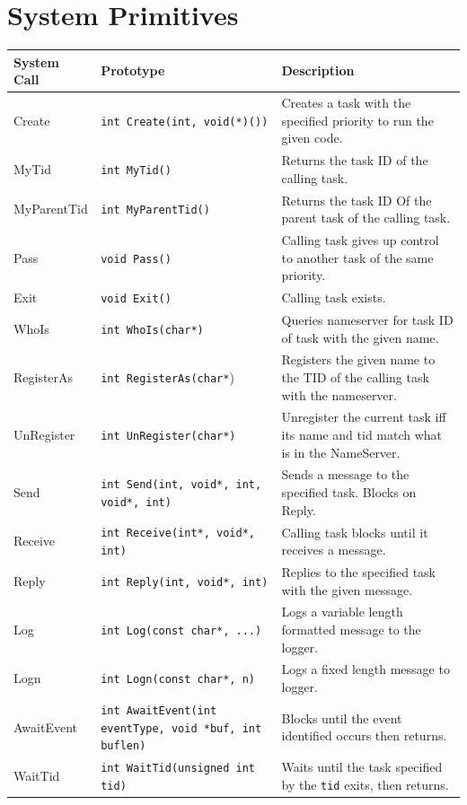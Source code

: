 \documentclass[12pt]{article}
\begin{document}
\section{System Primitives}
\begin{longtable}{|l|p{}|p{}|}
  \hline
  {\bf System Call} & {\bf Prototype} & {\bf Description} \\\hline
  Create & \texttt{int Create(int, void(*)())} & Creates a task with the specified priority to run the given code. \\\hline
  MyTid & \texttt{int MyTid()} & Returns the task ID of the calling task. \\\hline
  MyParentTid & \texttt{int MyParentTid()} & Returns the task ID Of the parent task of the calling task. \\\hline
  Pass & \texttt{void Pass()} & Calling task gives up control to another task of the same priority. \\\hline
  Exit & \texttt{void Exit()} & Calling task exists. \\\hline
  WhoIs & \texttt{int WhoIs(char*)} & Queries nameserver for task ID of task with the given name. \\\hline
  RegisterAs & \texttt{int RegisterAs(char*}) & Registers the given name to the TID of the calling task with the nameserver. \\\hline
  UnRegister & \texttt{int UnRegister(char*)} & Unregister the current task iff its name and tid match what is in the NameServer. \\\hline
  Send & \texttt{int Send(int, void*, int, void*, int)} & Sends a message to the specified task. Blocks on Reply. \\\hline
  Receive & \texttt{int Receive(int*, void*, int)} & Calling task blocks until it receives a message. \\\hline
  Reply & \texttt{int Reply(int, void*, int)} & Replies to the specified task with the given message. \\\hline
  Log & \texttt{int Log(const char*, ...)} & Logs a variable length formatted message to the logger. \\\hline
  Logn & \texttt{int Logn(const char*, n)} & Logs a fixed length message to logger. \\\hline
  AwaitEvent & \texttt{int AwaitEvent(int eventType, void *buf, int buflen)} & Blocks until the event identified occurs then returns. \\\hline
  WaitTid & \texttt{int WaitTid(unsigned int tid)} & Waits until the task specified by the \texttt{tid} exits, then returns. \\\hline

\end{longtable}
\end{document}
